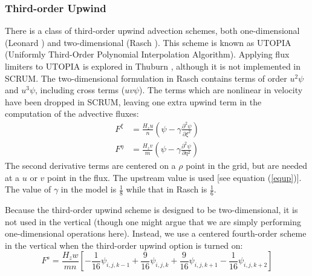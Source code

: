 \subsubsection{Third-order Upwind}
There is a class of third-order upwind advection schemes, both
one-dimensional (Leonard \cite{Leonard79}) and two-dimensional (Rasch
\cite{Rasch94}). This scheme is known as UTOPIA (Uniformly Third-Order
Polynomial Interpolation Algorithm). Applying flux limiters to UTOPIA
is explored in Thuburn \cite{Thuburn96}, although it is not implemented
in SCRUM. The two-dimensional formulation in Rasch contains terms of
order $u^2\psi$ and $u^3\psi$, including cross terms ($uv\psi$). The
terms which are nonlinear in velocity have been dropped in SCRUM,
leaving one extra upwind term in the computation of the advective
fluxes:
\begin{align}
   F^\xi &= \frac{H_z u}{n} \left( \psi - \gamma \frac{\partial^2
   \psi}{\partial \xi^2} \right) \\
   F^\eta &= \frac{H_z v}{m} \left( \psi - \gamma \frac{\partial^2
   \psi}{\partial \eta^2} \right)
\end{align}
The second derivative terms are centered on a $\rho$ point in the grid,
but are needed at a $u$ or $v$ point in the flux. The upstream value is
used [see equation (\ref{equp})]. The value of $\gamma$ in the model is
$\frac{1}{8}$ while that in Rasch \cite{Rasch94} is $\frac{1}{6}$.

Because the third-order upwind scheme is designed to be
two-dimensional, it is not used in the vertical (though one might argue
that we are simply performing one-dimensional operations here).
Instead, we use a centered fourth-order scheme in the vertical when
the third-order upwind option is turned on:
\begin{equation}
   F^s = \frac{H_z w}{mn} \left[
     - \frac{1}{16} \psi_{i,j,k-1} + \frac{9}{16} \psi_{i,j,k} +
       \frac{9}{16} \psi_{i,j,k+1} - \frac{1}{16} \psi_{i,j,k+2} \right]
\end{equation}

